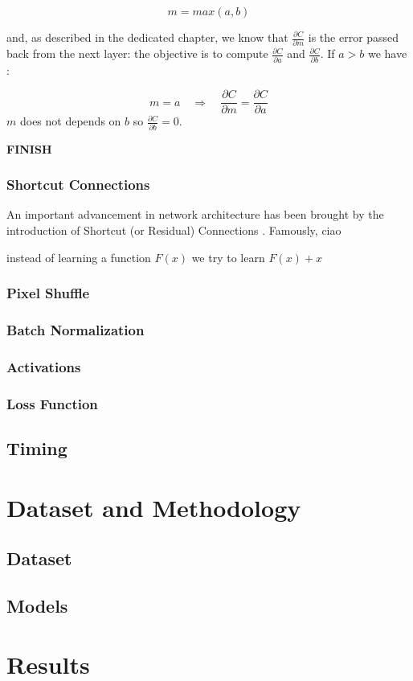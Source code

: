 \documentclass[12pt,a4paper]{report}
\begin{document}
\begin{equation}
 m = max(a, b)
\end{equation}

and, as described in the dedicated chapter, we know that $\frac{\partial C}{\partial m}$ is the error passed back from the next layer: the objective is to compute $\frac{\partial C}{\partial a}$ and $\frac{\partial C}{\partial b}$. 
If $a > b$ we have : 

\begin{equation}
 m = a \quad \Rightarrow \quad \frac{\partial C}{\partial m} = \frac{\partial C}{\partial a}
\end{equation}
$m$ does not depends on $b$ so $\frac{\partial C}{\partial b} = 0$.

{\bf FINISH}


\subsection*{Shortcut Connections}

An important advancement in network architecture has been brought by the introduction of Shortcut (or Residual) Connections \cite{residual}. Famously, ciao

instead of learning a function $F(x)$ we try to learn $F(x) + x$

\subsection*{Pixel Shuffle}
\subsection*{Batch Normalization}
\subsection*{Activations}
\subsection*{Loss Function}
\section{Timing}
\section{}

\chapter{Dataset and Methodology}

\section{Dataset}

\section{Models}

\chapter{Results}


\newpage
\nocite{*}


\end{document}
